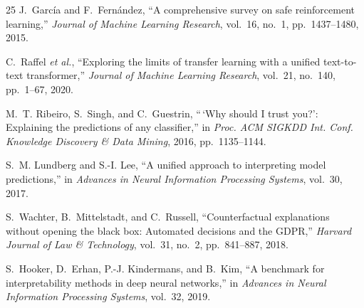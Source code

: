 \documentclass[conference]{IEEEtran}
\begin{document}
\begin{thebibliography}{25}
J.~Garc\'ia and F.~Fern\'andez, ``A comprehensive survey on safe reinforcement learning,'' \emph{Journal of Machine Learning Research}, vol.~16, no.~1, pp.~1437--1480, 2015.

C.~Raffel \emph{et al.}, ``Exploring the limits of transfer learning with a unified text-to-text transformer,'' \emph{Journal of Machine Learning Research}, vol.~21, no.~140, pp.~1--67, 2020.

M.~T. Ribeiro, S.~Singh, and C.~Guestrin, ``\,`Why should I trust you?': Explaining the predictions of any classifier,'' in \emph{Proc. ACM SIGKDD Int. Conf. Knowledge Discovery \& Data Mining}, 2016, pp.~1135--1144.

S.~M. Lundberg and S.-I. Lee, ``A unified approach to interpreting model predictions,'' in \emph{Advances in Neural Information Processing Systems}, vol.~30, 2017.

S.~Wachter, B.~Mittelstadt, and C.~Russell, ``Counterfactual explanations without opening the black box: Automated decisions and the GDPR,'' \emph{Harvard Journal of Law \& Technology}, vol.~31, no.~2, pp.~841--887, 2018.

S.~Hooker, D.~Erhan, P.-J. Kindermans, and B.~Kim, ``A benchmark for interpretability methods in deep neural networks,'' in \emph{Advances in Neural Information Processing Systems}, vol.~32, 2019.

\end{thebibliography}
\end{document}
